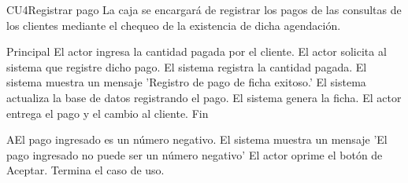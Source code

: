 
% 



	\begin{UseCase}{CU4}{Registrar pago}
{
		La caja se encargará de registrar los pagos de las consultas de los clientes mediante el chequeo de la existencia de dicha agendación.
}
	\end{UseCase}
	
\begin{UCtrayectoria}{Principal}
	\UCpaso	El actor ingresa la cantidad pagada por el cliente.
	\UCpaso El actor solicita al sistema que registre dicho pago. 
	\UCpaso El sistema registra la cantidad pagada.
	\UCpaso El sistema muestra un mensaje 'Registro de pago de ficha exitoso.' 
	\UCpaso El sistema actualiza la base de datos registrando el pago.
	\UCpaso El sistema genera la ficha.
	\UCpaso El actor entrega el pago y el cambio al cliente.
	\UCpaso Fin
\end{UCtrayectoria}
		
\begin{UCtrayectoriaA}{A}{El pago ingresado es un número negativo.}
			\UCpaso El sistema muestra un mensaje 'El pago ingresado no puede ser un número negativo'
			\UCpaso El actor oprime el botón de Aceptar.
			\UCpaso[] Termina el caso de uso.
\end{UCtrayectoriaA}

